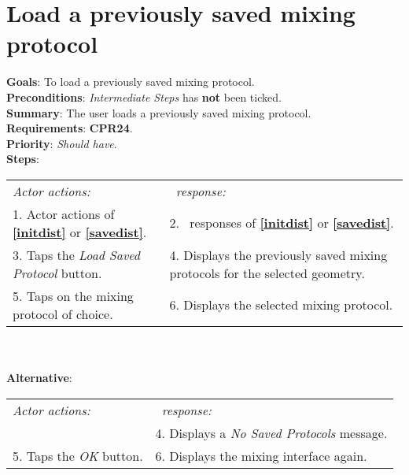   \section{Load a previously saved mixing protocol}
  \label{loadsaveprot}
  \textbf{Goals}: To load a previously saved mixing protocol.\\
  \textbf{Preconditions}: \emph{Intermediate Steps} has \textbf{not} been ticked.\\
  \textbf{Summary}: The user loads a previously saved mixing protocol.\\
  \textbf{Requirements}: \textbf{CPR24}.\\
  \textbf{Priority}: \emph{Should have}.\\
  \textbf{Steps}: \\
  \begin{tabular}{ p{} p{} }
  	\emph{Actor actions:} & \emph{\projectname\ response:} \\
  	1. Actor actions of \textbf{\ref{initdist}} or  \textbf{\ref{savedist}}. & 2. \projectname\ responses of \textbf{\ref{initdist}} or  \textbf{\ref{savedist}}. \\
	3. Taps the \emph{Load Saved Protocol} button. & 4. Displays the previously saved mixing protocols for the selected geometry. \\
	5. Taps on the mixing protocol of choice. & 6. Displays the selected mixing protocol.\\
	\end{tabular}
	        \\
     \\\textbf{Alternative}: \\
    \begin{tabular}{ p{} p{} }
  	\emph{Actor actions:} & \emph{\projectname\ response:} \\
            & 4. Displays a \emph{No Saved Protocols} message. \\
    5. Taps the \emph{OK} button. & 6. Displays the mixing interface again. \\
  \end{tabular}

